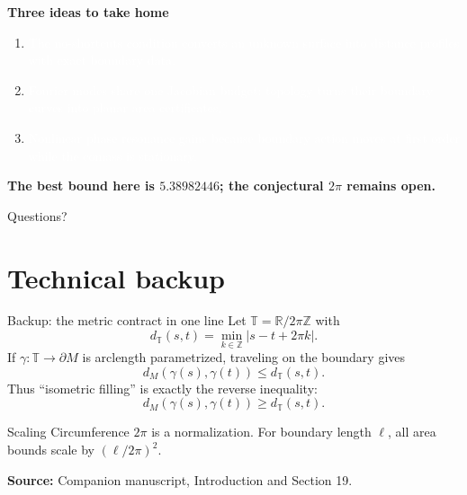 \documentclass[11pt,aspectratio=169,usepdftitle=false]{beamer}
\newcommand{\T}{\mathbb T}
\newcommand{\R}{\mathbb R}
\newcommand{\sourcefoot}[1]{\par\vfill{\tiny\color{Slate}\textbf{Source:} #1}}
\begin{document}
\begin{frame}\label{fr:takeaways}
  \color{white}
  {\LARGE\bfseries Three ideas to take home}\par
  \vspace{0.48cm}
  \begin{enumerate}
    \setlength{\itemsep}{0.50em}
    \item \textcolor{white}{The no-shortcuts condition converts an unknown surface
    into distance profiles with exact boundary data.}
    \item \textcolor{white}{Fourier modes share one Jacobian budget; topology turns
    their boundary curves into planar area certificates.}
    \item \textcolor{white}{Nonlinear phase resonance gains because boundary action
    moves at first order while the comass is stationary.}
  \end{enumerate}
  \vfill
  \begin{center}
  {\Large\color{WarmGold}\bfseries The best bound here is $5.38982446$; the
  conjectural $2\pi$ remains open.}\par
  \vspace{0.42cm}
  {\large Questions?}
  \end{center}
\end{frame}

\appendix
\section{Technical backup}

\begin{frame}{Backup: the metric contract in one line}\label{bk:metric}
  Let $\T=\R/2\pi\mathbb Z$ with
  \[
    d_{\T}(s,t)=\min_{k\in\mathbb Z}|s-t+2\pi k|.
  \]
  If $\gamma:\T\to\partial M$ is arclength parametrized, traveling on the
  boundary gives
  \[
    d_M(\gamma(s),\gamma(t))\le d_{\T}(s,t).
  \]
  Thus ``isometric filling'' is exactly the reverse inequality:
  \[
    \boxed{d_M(\gamma(s),\gamma(t))\ge d_{\T}(s,t).}
  \]
  \begin{exampleblock}{Scaling}
    Circumference $2\pi$ is a normalization. For boundary length $\ell$, all
    area bounds scale by $(\ell/2\pi)^2$.
  \end{exampleblock}
  \sourcefoot{Companion manuscript, Introduction and Section 19.}
\end{frame}
\end{document}

